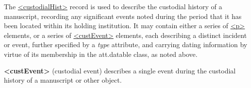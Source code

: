 The \hyperref[TEI.custodialHist]{<custodialHist>} record is used to describe the custodial history of a manuscript, recording any significant events noted during the period that it has been located within its holding institution. It may contain either a series of \hyperref[TEI.p]{<p>} elements, or a series of \hyperref[TEI.custEvent]{<custEvent>} elements, each describing a distinct incident or event, further specified by a {\itshape type} attribute, and carrying dating information by virtue of its membership in the \textsf{att.datable} class, as noted above. 
\begin{sansreflist}
  
\item [\textbf{<custEvent>}] (custodial event) describes a single event during the custodial history of a manuscript or other object.
\end{sansreflist}
\par
